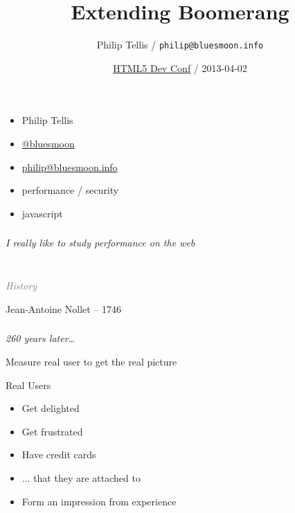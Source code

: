 \documentclass{beamer}
\author{Philip Tellis / \texttt{philip@bluesmoon.info}}
\title{Extending Boomerang}
\date{\href{http://html5devconf.com/}{HTML5 Dev Conf} / 2013-04-02}
\newcommand{\innersplash}[1]{
  \begin{center}
    \Large \textrm{\textit{ #1 } }
  \end{center}
}
\newcommand{\splashslide}[2][{}]{
  \begin{frame}
  \frametitle{#1}
  \innersplash{#2}
  \end{frame}
}
\newcommand{\leadinslide}[2]{
  \splashslide{
     {\fontsize{150}{20}\selectfont{\raisebox{0pt}[90pt][0pt]{\textcolor{light-gray}{#1}}}} \\ \huge \textcolor{gray}{#2}
  }
}
\begin{document}
\begin{frame}
  \titlepage
\end{frame}

\begin{frame}
  \begin{itemize}
  \item Philip Tellis
  \item \href{http://twitter.com/bluesmoon}{@bluesmoon}
  \item \href{http://bluesmoon.info/}{philip@bluesmoon.info}
  \item performance / security
  \item javascript
  \end{itemize}
\end{frame}

\splashslide{I really like to study performance on the web}

\leadinslide{0}{History}

\begin{frame}{Jean-Antoine Nollet -- 1746}
\end{frame}

\splashslide{260 years later\ldots}


\begin{frame}{Measure real user to get the real picture}
\end{frame}

\begin{frame}{Real Users}
    \begin{block}{}
      \begin{itemize}
        \item Get delighted
        \item<2-> Get frustrated
        \item<3-> Have credit cards
        \item<4-> ... that they are attached to
        \item<5-> Form an impression from experience
      \end{itemize}
    \end{block}
\end{frame}
\end{document}
